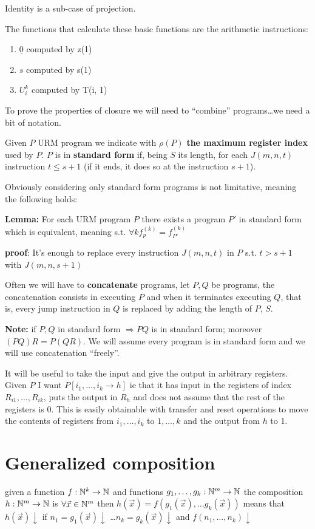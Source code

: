 Identity is a sub-case of projection.

The functions that calculate these basic functions are the arithmetic instructions:
\begin{enumerate}
\item $\underline{0}$ computed by z(1)
\item $s$ computed by s(1)
\item $ U_i^k$ computed by T(i, 1)
\end{enumerate}

To prove the properties of closure we will need to ``combine'' programs\dots we need a bit of notation.

Given $P$ URM program we indicate with $ \rho(P) $ \textbf{the maximum register index} used by $P$. $P$ is in \textbf{standard form} if, being $S$ its length, for each $J(m,n,t)$ instruction $t\leq s+1$ (if it ends, it does so at the instruction $s+1$).

Obviously considering only standard form programs is not limitative, meaning the following holds:

\textbf{Lemma:} For each URM program $P$ there exists a program $P'$ in standard form which is equivalent, meaning s.t. $\forall k f_p^{(k)} = f_{P'}^{(k)}$

\textbf{proof}: It's enough to replace every instruction $J(m,n,t)$ in $P$ s.t. $t>s+1$ with $J(m,n,s+1)$

Often we will have to \textbf{concatenate} programs, let $P, Q$ be programs, the concatenation consists in executing $P$ and when it terminates executing $Q$, that is, every jump instruction in $Q$ is replaced by adding the length of $P$, $S$.

\textbf{Note:} if $P,Q$ in standard form $\Rightarrow PQ$ is in standard form; moreover $(PQ)R = P(QR)$. We will assume every program is in standard form and we will use concatenation ``freely''.

It will be useful to take the input and give the output in arbitrary registers. Given $P$ I want $ P[i_1,\dots,i_k \rightarrow h] $ ie that it has input in the registers of index $ R_{i1},\dots,R_{ik} $, puts the output in $ R_h $ and does not assume that the rest of the registers is 0. This is easily obtainable with transfer and reset operations to move the contents of registers from $ i_1,\dots,i_k $ to $ 1,\dots,k $ and the output from $h$ to 1.

\section {Generalized composition}
given a function
$ f: \mathbb{N}^k \rightarrow \mathbb{N} $ and functions
$ g_1,\dots,g_k: \mathbb{N}^m \rightarrow \mathbb{N} $
the composition $ h: \mathbb{N}^m \rightarrow \mathbb{N} $
is $ \forall \vec{x} \in \mathbb{N}^m $ then
$ h(\vec{x}) = f(g_1(\vec{x}), \dots g_k(\vec{x}))
$ means that $ h(\vec{x}) \downarrow $ if $ n_1 = g_1(\vec{x}) \downarrow $
\dots $ n_k = g_k(\vec{x}) \downarrow $ and $ f(n_1,\dots,n_k) \downarrow $

